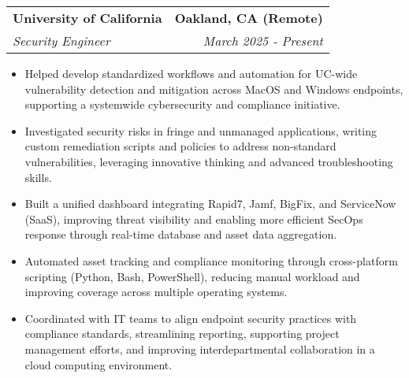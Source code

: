 \documentclass[letterpaper,10pt]{article}
\makeatletter
\newcommand{\resumeItem}[1]{\item\small{#1}}
\newcommand{\resumeItemListStart}{\begin{itemize}}
\newcommand{\resumeItemListEnd}{\end{itemize}\vspace{-2pt}}
\newcommand{\resumeSubheading}[4]{%
  \vspace{-2pt}\item
  \begin{tabular*}{\textwidth}[t]{l@{\extracolsep{\fill}}r}
    \textbf{\large #1} & \textbf{\small #2} \\
    \textit{\large #3} & \textit{\small #4} \\
  \end{tabular*}\vspace{-2pt}
}
\makeatother
\begin{document}
\resumeSubheading
  {University of California}{Oakland, CA (Remote)}
  {Security Engineer}{March 2025 - Present}
  \vspace{2pt}
\resumeItemListStart
  \resumeItem{Helped develop standardized workflows and automation for UC-wide vulnerability detection and mitigation across MacOS and Windows endpoints, supporting a systemwide cybersecurity and compliance initiative.}
  \resumeItem{Investigated security risks in fringe and unmanaged applications, writing custom remediation scripts and policies to address non-standard vulnerabilities, leveraging innovative thinking and advanced troubleshooting skills.}
  \resumeItem{Built a unified dashboard integrating Rapid7, Jamf, BigFix, and ServiceNow (SaaS), improving threat visibility and enabling more efficient SecOps response through real-time database and asset data aggregation.}
  \resumeItem{Automated asset tracking and compliance monitoring through cross-platform scripting (Python, Bash, PowerShell), reducing manual workload and improving coverage across multiple operating systems.}
  \resumeItem{Coordinated with IT teams to align endpoint security practices with compliance standards, streamlining reporting, supporting project management efforts, and improving interdepartmental collaboration in a cloud computing environment.}
\resumeItemListEnd
\vspace{6pt}
\end{document}
